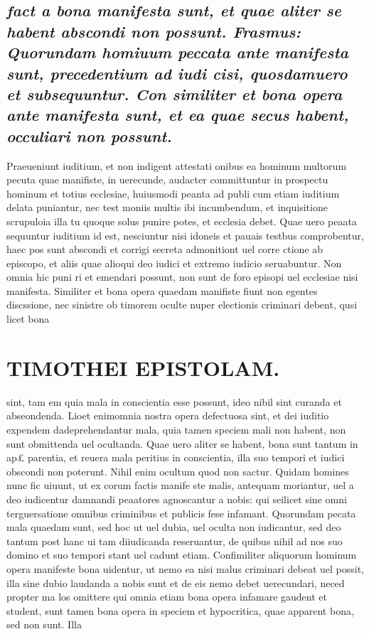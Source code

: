 \documentclass{article}
\begin{document}
\begin{pages}
\subsection*{\textit{fact a bona manifesta sunt, et quae aliter se habent abscondi non possunt. Frasmus: Quorundam homiuum peccata ante manifesta sunt, precedentium ad iudi cisi, quosdamuero et subsequuntur. Con similiter et bona opera ante manifesta sunt, et ea quae secus habent, occuliari non possunt. }}\pstart Praeueniunt iuditium, et non indigent attestati onibus ea hominum multorum pecuta quae manifiste, in uerecunde, audacter committuntur in prospectu hominum et totius ecclesiae, huiusmodi peanta ad publi cum etiam iuditium delata puniantur, nec test moniis multis ibi incumbendum, et inquisitione scrupuloia illa tu quoque solus punire potes, et ecclesia debet. Quae uero peaata sequuntur iuditium id est, nesciuntur nisi idoneis et pauais testbus comprobentur, haec pos sunt abscondi et corrigi secreta admonitiont uel corre ctione ab episcopo, et aliis quae alioqui deo iudici et extremo iudicio seruabuntur. Non omnia hic puni ri et emendari possunt, non sunt de foro episopi uel ecclesiae nisi manifesta.  \pend\pstart Similiter et bona opera quaedam manifiste fiunt non egentes discssione, nec sinistre ob timorem oculte nuper electionis criminari debent, qusi licet bona  \pend
\section*{TIMOTHEI EPISTOLAM. }
\marginpar{[ p.151 ]}\pstart sint, tam em quia mala in conscientia esse possunt, ideo nibil sint curanda et abseondenda. Lioet enimomnia nostra opera defectuosa sint, et dei iuditio expendem dadeprehendantur mala, quia tamen speciem mali non habent, non sunt obmittenda uel ocultanda. Quae uero aliter se habent, bona sunt tantum in ap£ parentia, et reuera mala peritius in conscientia, illa suo tempori et iudici obscondi non poterunt. Nihil enim ocultum quod non sactur.  \pend\pstart Quidam homines nunc fic uiuunt, ut ex corum factis manife ste malis, antequam moriantur, uel a deo iudicentur damnandi peaatores agnoscantur a nobis: qui seilicet sine omni terguersatione omnibus criminibus et publicis fese infamant. Quorundam pecata mala quaedam sunt, sed hoc ut uel dubia, uel oculta non iudicantur, sed deo tantum post hanc ui tam diiudicanda reseruantur, de quibus nihil ad nos suo domino et suo tempori stant uel cadunt etiam. Confimiliter aliquorum hominum opera manifeste bona uidentur, ut nemo ea nisi malus criminari debeat uel possit, illa sine dubio laudanda a nobis sunt et de eis nemo debet uerecundari, neced propter ma los omittere qui omnia etiam bona opera infamare gaudent et student, sunt tamen bona opera in speciem et hypocritica, quae apparent bona, sed non sunt. Illa  \pend

\end{pages}
\end{document}
